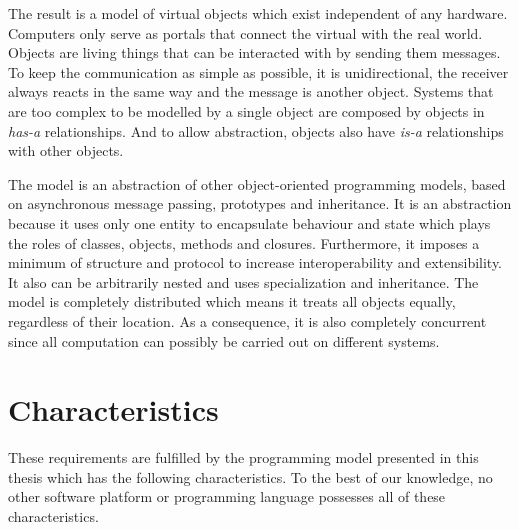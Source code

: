 The result is a model of virtual objects which exist independent of any hardware. Computers only serve as portals that connect the virtual with the real world. Objects are living things that can be interacted with by sending them messages. To keep the communication as simple as possible, it is unidirectional, the receiver always reacts in the same way and the message is another object. Systems that are too complex to be modelled by a single object are composed by objects in \textit{has-a} relationships. And to allow abstraction, objects also have \textit{is-a} relationships with other objects.

The model is an abstraction of other object-oriented programming models, based on asynchronous message passing, prototypes and inheritance. It is an abstraction because it uses only one entity to encapsulate behaviour and state which plays the roles of classes, objects, methods and closures. Furthermore, it imposes a minimum of structure and protocol to increase interoperability and extensibility. It also can be arbitrarily nested and uses specialization and inheritance. The model is completely distributed which means it treats all objects equally, regardless of their location. As a consequence, it is also completely concurrent since all computation can possibly be carried out on different systems.

\section{Characteristics}

These requirements are fulfilled by the programming model presented in this thesis which has the following characteristics. To the best of our knowledge, no other software platform or programming language possesses all of these characteristics.

